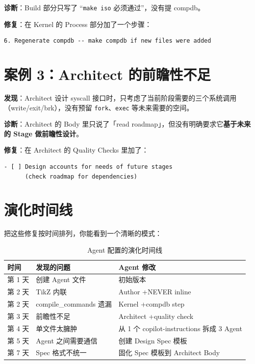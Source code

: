 \textbf{诊断}：Build 部分只写了 ``\texttt{make iso} 必须通过''，没有提 compdb。

\textbf{修复}：在 Kernel 的 Process 部分加了一个步骤：

\begin{lstlisting}[style=yamlstyle]
6. Regenerate compdb -- make compdb if new files were added
\end{lstlisting}

\section{案例 3：Architect 的前瞻性不足}

\textbf{发现}：Architect 设计 syscall 接口时，只考虑了当前阶段需要的三个系统调用（write/exit/brk），没有预留 \texttt{fork}、\texttt{exec} 等未来需要的空间。

\textbf{诊断}：Architect 的 Body 里只说了「read roadmap」，但没有明确要求它\textbf{基于未来的 Stage 做前瞻性设计}。

\textbf{修复}：在 Architect 的 Quality Checks 里加了：

\begin{lstlisting}[style=yamlstyle]
- [ ] Design accounts for needs of future stages
      (check roadmap for dependencies)
\end{lstlisting}

\section{演化时间线}

把这些修复按时间排列，你能看到一个清晰的模式：

\begin{table}[H]
\centering
\small
\begin{tabularx}{\textwidth}{lXl}
\toprule
\textbf{时间} & \textbf{发现的问题} & \textbf{Agent 修改} \\
\midrule
第 1 天 & 创建 Agent 文件 & 初始版本 \\
第 2 天 & TikZ 内联 & Author +NEVER inline \\
第 2 天 & compile\_commands 遗漏 & Kernel +compdb step \\
第 3 天 & 前瞻性不足 & Architect +quality check \\
第 4 天 & 单文件太臃肿 & 从 1 个 copilot-instructions 拆成 3 Agent \\
第 5 天 & Agent 之间需要通信 & 创建 Design Spec 模板 \\
第 7 天 & Spec 格式不统一 & 固化 Spec 模板到 Architect Body \\
\bottomrule
\end{tabularx}
\caption{Agent 配置的演化时间线}
\end{table}


